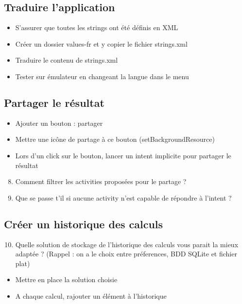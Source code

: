 \documentclass{article}
\begin{document}
\subsection{Traduire l'application}
\begin{itemize}
\item S'assurer que toutes les strings ont été définis en XML
\item Créer un dossier values-fr et y copier le fichier strings.xml
\item Traduire le contenu de strings.xml
\item Tester sur émulateur en changeant la langue dans le menu
\end{itemize}
\subsection{Partager le résultat}
\begin{itemize}
\item Ajouter un bouton : partager
\item Mettre une icône de partage à ce bouton (setBackgroundResource)
\item Lors d'un click sur le bouton, lancer un intent implicite pour partager le résultat
\end{itemize}
\begin{enumerate}
 \setcounter{enumi}{7}
\item Comment filtrer les activities proposées pour le partage ?
\item Que se passe t'il si aucune activity n'est capable de répondre à l'intent ?
\end{enumerate}
\subsection{Créer un historique des calculs}
\begin{enumerate}
 \setcounter{enumi}{9}
\item Quelle solution de stockage de l'historique des calculs vous parait la mieux adaptée ? (Rappel : on a le choix entre préferences, BDD SQLite et fichier plat) 
\end{enumerate}
\begin{itemize}
\item Mettre en place la solution choisie
\item A chaque calcul, rajouter un élément à l'historique
\end{itemize}
\end{document}

